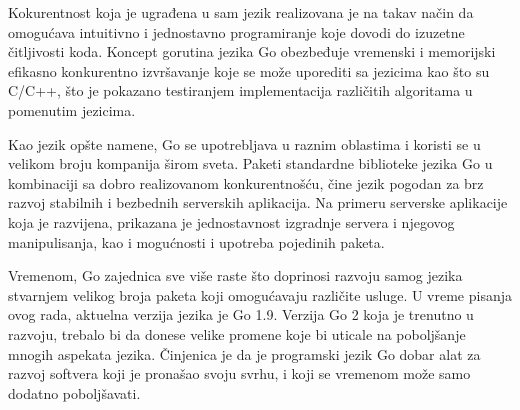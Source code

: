 \documentclass[12pt,oneside]{memoir}
\begin{document}
Kokurentnost koja je ugrađena u sam jezik realizovana je na takav način da omogućava intuitivno i jednostavno programiranje koje dovodi do izuzetne čitljivosti koda. Koncept gorutina jezika Go obezbeđuje vremenski i memorijski efikasno konkurentno izvršavanje koje se može uporediti sa jezicima kao što su C/C++, što je pokazano testiranjem implementacija različitih algoritama u pomenutim jezicima.

Kao jezik opšte namene, Go se upotrebljava u raznim oblastima i koristi se u velikom broju kompanija širom sveta. Paketi standardne biblioteke jezika Go u kombinaciji sa dobro realizovanom konkurentnošću, čine jezik pogodan za brz razvoj stabilnih i bezbednih serverskih aplikacija. Na primeru serverske aplikacije koja je razvijena, prikazana je jednostavnost izgradnje servera i njegovog manipulisanja, kao i mogućnosti i upotreba pojedinih paketa. 

Vremenom, Go zajednica sve više raste što doprinosi razvoju samog jezika stvarnjem velikog broja paketa koji omogućavaju različite usluge. U vreme pisanja ovog rada, aktuelna verzija jezika je Go 1.9. Verzija Go 2 koja je trenutno u razvoju, trebalo bi da donese velike promene koje bi uticale na poboljšanje mnogih aspekata jezika. Činjenica je da je programski jezik Go dobar alat za razvoj softvera koji je pronašao svoju svrhu, i koji se vremenom može samo dodatno poboljšavati.


\printbibliography 
\backmatter
\end{document}
